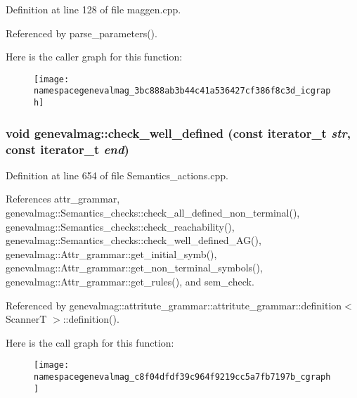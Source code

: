 Definition at line 128 of file maggen.cpp.

Referenced by parse\_\-parameters().

Here is the caller graph for this function:\nopagebreak
\begin{figure}[H]
\begin{center}
\leavevmode
\texttt{[image: namespacegenevalmag\_3bc888ab3b44c41a536427cf386f8c3d\_icgraph]}
\end{center}
\end{figure}
\hypertarget{namespacegenevalmag_c8f04dfdf39c964f9219cc5a7fb7197b}{
\subsubsection[{check\_\-well\_\-defined}]{\setlength{\rightskip}{0pt plus 5cm}void genevalmag::check\_\-well\_\-defined (const iterator\_\-t {\em str}, \/  const iterator\_\-t {\em end})}}
\label{namespacegenevalmag_c8f04dfdf39c964f9219cc5a7fb7197b}




Definition at line 654 of file Semantics\_\-actions.cpp.

References attr\_\-grammar, genevalmag::Semantics\_\-checks::check\_\-all\_\-defined\_\-non\_\-terminal(), genevalmag::Semantics\_\-checks::check\_\-reachability(), genevalmag::Semantics\_\-checks::check\_\-well\_\-defined\_\-AG(), genevalmag::Attr\_\-grammar::get\_\-initial\_\-symb(), genevalmag::Attr\_\-grammar::get\_\-non\_\-terminal\_\-symbols(), genevalmag::Attr\_\-grammar::get\_\-rules(), and sem\_\-check.

Referenced by genevalmag::attritute\_\-grammar::attritute\_\-grammar::definition$<$ ScannerT $>$::definition().

Here is the call graph for this function:\nopagebreak
\begin{figure}[H]
\begin{center}
\leavevmode
\texttt{[image: namespacegenevalmag\_c8f04dfdf39c964f9219cc5a7fb7197b\_cgraph]}
\end{center}
\end{figure}


